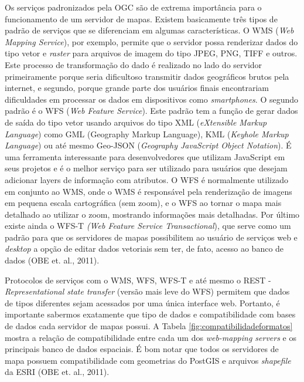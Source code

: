 		Os serviços padronizados pela OGC são de extrema importância para o funcionamento de um servidor de mapas. Existem basicamente três tipos de padrão de serviços que se diferenciam em algumas características. O WMS (\textit{Web Mapping Service}), por exemplo, permite que o servidor possa renderizar dados do tipo vetor e \textit{raster} para arquivos de imagem do tipo JPEG, PNG, TIFF e outros. Este processo de transformação do dado é realizado no lado do servidor primeiramente porque seria dificultoso transmitir dados geográficos brutos pela internet, e segundo, porque grande parte dos usuários finais encontrariam dificuldades em processar os dados em dispositivos como \textit{smartphones}. O segundo padrão é o WFS (\textit{Web Feature Service}). Este padrão tem a função de gerar dados de saída do tipo vetor usando arquivos do tipo XML (\textit{eXtensible Markup Language}) como GML (Geography Markup Language), KML (\textit{Keyhole Markup Language}) ou até mesmo Geo-JSON (\textit{Geography JavaScript Object Notation}). É uma ferramenta interessante para desenvolvedores que utilizam JavaScript em seus projetos e é o melhor serviço para ser utilizado para usuários que desejam adicionar layers de informação com atributos. O WFS é normalmente utilizado em conjunto ao WMS, onde o WMS é responsável pela renderização de imagens em pequena escala cartográfica (sem zoom), e o WFS ao tornar o mapa mais detalhado ao utilizar o zoom, mostrando informações mais detalhadas. Por último existe ainda o WFS-T \textit{(Web Feature Service Transactional}), que serve como um padrão para que os servidores de mapas possibilitem ao usuário de serviços web e \textit{desktop} a opção de editar dados vetoriais sem ter, de fato, acesso ao banco de dados (OBE et. al., 2011)\cite{OBE_etal11}. 
		
		Protocolos de serviços com o WMS, WFS, WFS-T e até mesmo o REST - \textit{Representational state transfer} (versão mais leve do WFS) permitem que dados de tipos diferentes sejam acessados por uma única interface web. Portanto, é importante sabermos exatamente que tipo de dados e compatibilidade com bases de dados cada servidor de mapas possui. A Tabela \ref{fig:compatibilidadeformatos} mostra a relação de compatibilidade entre cada um dos \textit{web-mapping servers} e os principais banco de dados espaciais. É bom notar que todos os servidores de mapa possuem compatibilidade com geometrias do PostGIS e arquivos \textit{shapefile} da ESRI (OBE et. al., 2011)\cite{OBE_etal11}.
		
